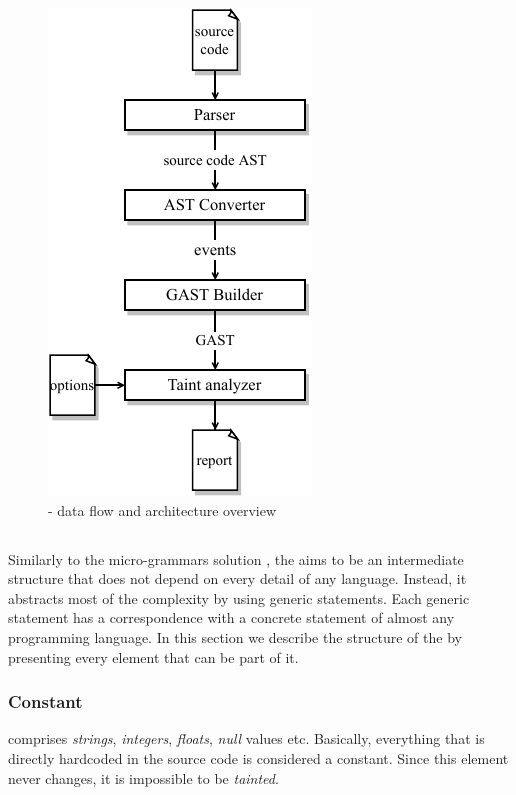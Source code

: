\begin{figure}[h]
    \centering
    \includegraphics[width =0.5\linewidth]{images/yasat-architecture.pdf}
    \caption{\toolname{} - data flow and architecture overview} 
    \label{architecture}
\end{figure}

\subsection{\astname{}}
\label{genericast}
Similarly to the micro-grammars solution \cite{microgrammars}, the \astname{} aims to be an intermediate structure that does not depend on every detail of any language. Instead, it abstracts most of the complexity by using generic statements. Each generic statement has a correspondence with a concrete statement of almost any programming language. In this section we describe the structure of the \astname{} by presenting every element that can be part of it. 

\subsubsection{Constant} comprises \textit{strings}, \textit{integers}, \textit{floats}, \textit{null} values etc. Basically, everything that is directly hardcoded in the source code is considered a constant. Since this element never changes, it is impossible to be \textit{tainted}.
 
